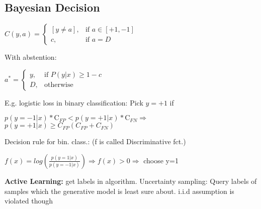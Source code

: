 \subsection{Bayesian Decision}

\begin{center}
    $C(y,a) = \begin{cases}
        [y \neq a], & \text{if } a \in [+1,-1]\\
        c, & \text{if } a = D
    \end{cases}$
\end{center}

With abstention:
\begin{center}
    $a^* = \begin{cases}
        y, & \text{if } P(y|x) \geq 1-c\\
        D, & \text{otherwise} 
    \end{cases}$
\end{center}

E.g. logistic loss in binary classification: Pick $y = +1$ if
\begin{center}
    $p(y=-1|x) * \text{C}_{FP} < p(y=+1|x)*\text{C}_{FN} \Rightarrow$\\$ p(y=+1|x)\geq C_{FP}(C_{FP} + C_{FN})$
\end{center}

Decision rule for bin. class.: (f is called Discriminative fct.)

$f(x) = log(\frac{p(y=1|x)}{p(y=-1|x)}) \Rightarrow f(x)>0 \Rightarrow $ choose y=1

\textbf{Active Learning:} get labels in algorithm. Uncertainty sampling: Query labels of samples which the generative model is least sure about. i.i.d assumption is violated though


